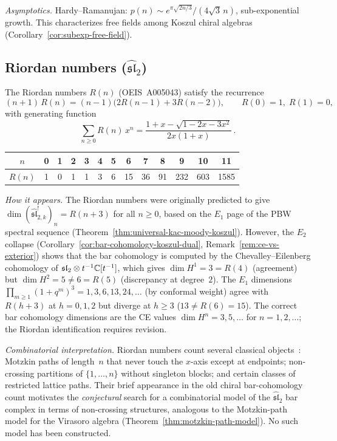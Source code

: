 \emph{Asymptotics.}
Hardy--Ramanujan: $p(n) \sim e^{\pi\sqrt{2n/3}}/(4\sqrt{3}\,n)$, sub-exponential growth.  This characterizes free fields among Koszul chiral algebras (Corollary~\ref{cor:subexp-free-field}).

\subsection{Riordan numbers ($\widehat{\mathfrak{sl}}_2$)}
\label{subsec:riordan}

The Riordan numbers $R(n)$ (OEIS~A005043) satisfy the recurrence
\begin{equation}\label{eq:riordan-recurrence}
(n+1)\,R(n) = (n-1)\bigl(2R(n-1) + 3R(n-2)\bigr),
\qquad R(0) = 1,\; R(1) = 0,
\end{equation}
with generating function
\begin{equation}\label{eq:riordan-gf}
\sum_{n \geq 0} R(n)\,x^n
= \frac{1 + x - \sqrt{1-2x-3x^2}}{2x(1+x)}\,.
\end{equation}

\begin{center}
\renewcommand{\arraystretch}{1.2}
\begin{tabular}{c|cccccccccccc}
$n$ & 0 & 1 & 2 & 3 & 4 & 5 & 6 & 7 & 8 & 9 & 10 & 11 \\
\hline
$R(n)$ & 1 & 0 & 1 & 1 & 3 & 6 & 15 & 36 & 91 & 232 & 603 & 1585
\end{tabular}
\end{center}

\emph{How it appears.}
The Riordan numbers were originally predicted to give
$\dim(\widehat{\mathfrak{sl}}_{2,k}^!)_n = R(n+3)$ for all
$n \geq 0$, based on the $E_1$ page of the PBW spectral
sequence (Theorem~\ref{thm:universal-kac-moody-koszul}).
However, the $E_2$ collapse
(Corollary~\ref{cor:bar-cohomology-koszul-dual},
Remark~\ref{rem:ce-vs-exterior}) shows that the bar
cohomology is computed by the Chevalley--Eilenberg
cohomology of $\mathfrak{sl}_2 \otimes t^{-1}\mathbb{C}[t^{-1}]$,
which gives $\dim H^1 = 3 = R(4)$ (agreement) but
$\dim H^2 = 5 \neq 6 = R(5)$ (discrepancy at degree~$2$).
The $E_1$ dimensions
$\prod_{m \geq 1}(1+q^m)^3 = 1, 3, 6, 13, 24, \ldots$
(by conformal weight) agree with $R(h+3)$ at
$h = 0, 1, 2$ but diverge at $h \geq 3$
($13 \neq R(6) = 15$).
The correct bar cohomology dimensions are the CE values
$\dim H^n = 3, 5, \ldots$ for $n = 1, 2, \ldots$;
the Riordan identification requires revision.

\emph{Combinatorial interpretation.}
Riordan numbers count several classical objects~\cite{BernhartRiordan}: Motzkin paths of length~$n$ that never touch the $x$-axis except at endpoints; non-crossing partitions of $\{1, \ldots, n\}$ without singleton blocks; and certain classes of restricted lattice paths.  Their brief appearance in the old chiral bar-cohomology count motivates the \emph{conjectural} search for a combinatorial model of the $\widehat{\mathfrak{sl}}_2$ bar complex in terms of non-crossing structures, analogous to the Motzkin-path model for the Virasoro algebra (Theorem~\ref{thm:motzkin-path-model}).  No such model has been constructed.

